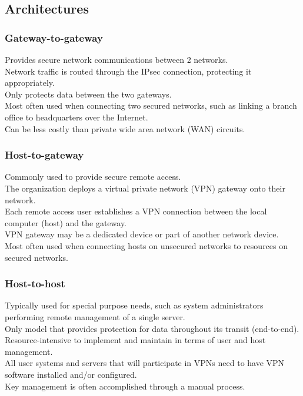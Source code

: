 \documentclass{article}
\begin{document}
\subsection{Architectures}

\subsubsection{Gateway-to-gateway}

Provides secure network communications between 2 networks.\\
Network traffic is routed through the IPsec connection, protecting it appropriately.\\
Only protects data between the two gateways.\\
Most often used when connecting two secured networks, such as linking a branch office to headquarters over the Internet.\\
Can be less costly than private wide area network (WAN) circuits.

\subsubsection{Host-to-gateway}

Commonly used to provide secure remote access.\\
The organization deploys a virtual private network (VPN) gateway onto their network.\\
Each remote access user establishes a VPN connection between the local computer (host) and the gateway.\\
VPN gateway may be a dedicated device or part of another network device.\\
Most often used when connecting hosts on unsecured networks to resources on secured networks.

\subsubsection{Host-to-host}

Typically used for special purpose needs, such as system administrators performing remote management of a single server.\\
Only model that provides protection for data throughout its transit (end-to-end).\\
Resource-intensive to implement and maintain in terms of user and host management.\\
All user systems and servers that will participate in VPNs need to have VPN software installed and/or configured.\\
Key management is often accomplished through a manual process.
\end{document}
